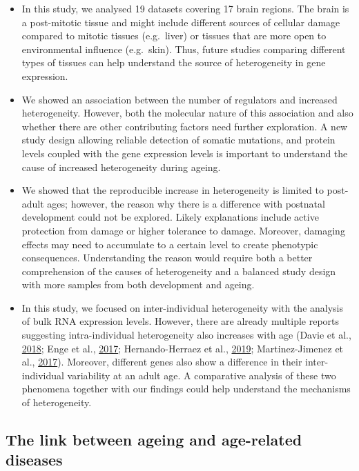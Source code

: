 \documentclass[12pt,twoside]{unicam}
\providecommand{\tightlist}{%
  \setlength{\itemsep}{0pt}\setlength{\parskip}{0pt}}
\begin{document}
\begin{itemize}
\tightlist
\item
  In this study, we analysed 19 datasets covering 17 brain regions. The brain is a post-mitotic tissue and might include different sources of cellular damage compared to mitotic tissues (e.g.~liver) or tissues that are more open to environmental influence (e.g.~skin). Thus, future studies comparing different types of tissues can help understand the source of heterogeneity in gene expression.
\item
  We showed an association between the number of regulators and increased heterogeneity. However, both the molecular nature of this association and also whether there are other contributing factors need further exploration. A new study design allowing reliable detection of somatic mutations, and protein levels coupled with the gene expression levels is important to understand the cause of increased heterogeneity during ageing.
\item
  We showed that the reproducible increase in heterogeneity is limited to post-adult ages; however, the reason why there is a difference with postnatal development could not be explored. Likely explanations include active protection from damage or higher tolerance to damage. Moreover, damaging effects may need to accumulate to a certain level to create phenotypic consequences. Understanding the reason would require both a better comprehension of the causes of heterogeneity and a balanced study design with more samples from both development and ageing.
\item
  In this study, we focused on inter-individual heterogeneity with the analysis of bulk RNA expression levels. However, there are already multiple reports suggesting intra-individual heterogeneity also increases with age (Davie et al., \protect\hyperlink{ref-Davie2018}{2018}; Enge et al., \protect\hyperlink{ref-Enge2017}{2017}; Hernando-Herraez et al., \protect\hyperlink{ref-Hernando-Herraez2019}{2019}; Martinez-Jimenez et al., \protect\hyperlink{ref-Martinez-Jimenez2017}{2017}). Moreover, different genes also show a difference in their inter-individual variability at an adult age. A comparative analysis of these two phenomena together with our findings could help understand the mechanisms of heterogeneity.
\end{itemize}

\hypertarget{the-link-between-ageing-and-age-related-diseases}{%
\subsection{The link between ageing and age-related diseases}\label{the-link-between-ageing-and-age-related-diseases}}
\end{document}
